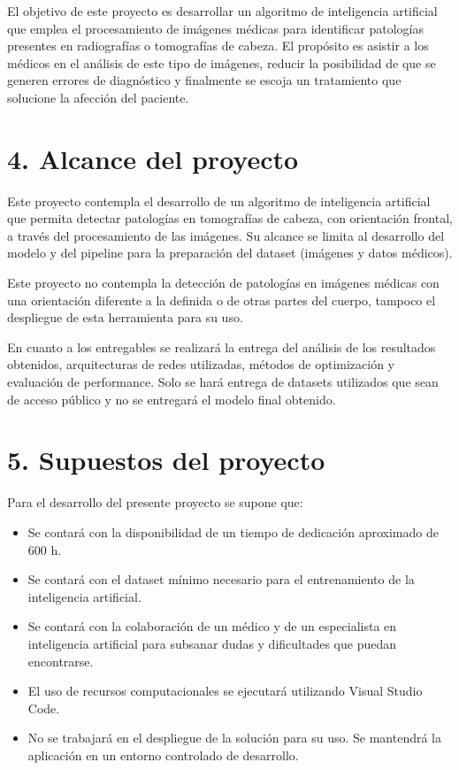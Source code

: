 \documentclass[
11pt, %
]{charter}
\begin{document}
El objetivo de este proyecto es desarrollar un algoritmo de inteligencia artificial que emplea el procesamiento  
de imágenes médicas para identificar patologías presentes en radiografías o tomografías de cabeza. El propósito es 
asistir a los médicos en el análisis de este tipo de imágenes, reducir la posibilidad de que se generen errores  
de diagnóstico y finalmente se escoja un tratamiento que solucione la afección del paciente. 

\section{4. Alcance del proyecto}
\label{sec:alcance}

Este proyecto contempla el desarrollo de un algoritmo de inteligencia artificial que permita detectar patologías en 
tomografías de cabeza, con orientación frontal, a través del procesamiento de las imágenes. Su alcance se limita al 
desarrollo del modelo y del pipeline para la preparación del dataset (imágenes y datos médicos). 

Este proyecto no contempla la detección de patologías en imágenes médicas con una orientación diferente a la 
definida o de otras partes del cuerpo, tampoco el despliegue de esta herramienta para su uso.

En cuanto a los entregables se realizará la entrega del análisis de los resultados obtenidos, arquitecturas de  
redes utilizadas, métodos de optimización y evaluación de performance. Solo se hará entrega de datasets utilizados 
que sean de acceso público y no se entregará el modelo final obtenido.


\section{5. Supuestos del proyecto}
\label{sec:supuestos}

Para el desarrollo del presente proyecto se supone que:

\begin{itemize}
	\item Se contará con la disponibilidad de un tiempo de dedicación aproximado de 600 h.
	\item Se contará con el dataset mínimo necesario para el entrenamiento de la inteligencia
	artificial.
	\item Se contará con la colaboración de un médico y de un especialista en inteligencia artificial
	para subsanar dudas y dificultades que puedan encontrarse.
	\item El uso de recursos computacionales se ejecutará utilizando Visual Studio Code.
	\item No se trabajará en el despliegue de la solución para su uso. Se mantendrá la aplicación
	en un entorno controlado de desarrollo.
\end{itemize}
\end{document}
